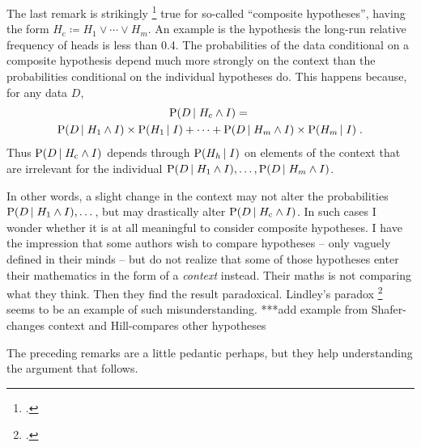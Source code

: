\documentclass[\ifafour a4paper,12pt,\else a5paper,10pt,\fi%
onecolumn,oneside,article,%
british%
]{memoir}
\theoremstyle{remark}
\theoremstyle{innote}
\newcommand*{\citep}{\footcites}
\newcommand*{\defd}{\coloneqq}
\newcommand*{\p}{\mathrm{P}}%
\renewcommand*{\|}[1][]{\nonscript\,#1\vert\nonscript\;\mathopen{}}
\newcommand*{\sect}{\S}%
\newcommand*{\cf}{{cf.}}
\newcommand*{\prop}[1]{\text{\textquoteleft}#1\text{\textquoteright}}
\newcommand*{\yK}{I}
\newcommand*{\yHc}{H_{\text{c}}}
\begin{document}
The last remark is strikingly \citep[\cf][\sect~6.1.4
p.~391]{bernardoetal1994_r2000} true for so-called \enquote{composite
  hypotheses}, having the form $\yHc \defd H_{1} \lor \dotsb \lor H_{m}$.
An example is the hypothesis \prop{the long-run relative frequency of heads
  is less than 0.4}. The probabilities of the data conditional on a
composite hypothesis depend much more strongly on the context than the
probabilities conditional on the individual hypotheses do. This happens
because, for any data $D$,
\begin{multline}
  \label{eq:comp_hyp}
  \p( D \| %
  \yHc \land \yK)
  ={}\\
 \p( D \| H_{1} \land \yK) \times \p(H_{1} \| \yK) +
  \dotsb +
 \p( D \| H_{m} \land \yK) \times \p(H_{m} \| \yK) \;.
\end{multline}
Thus $\p( D \| \yHc \land \yK)$ depends through $\p(H_{h} \| \yK)$ on
elements of the context that are irrelevant for the individual
$\p( D \| H_{1} \land \yK),\dotsc, \p( D \| H_{m} \land \yK)$.

In other words, a slight change in the context may not alter the
probabilities $\p( D \| H_{1} \land \yK),\dotsc$, but may drastically alter
$\p( D \| \yHc \land \yK)$. In such cases I wonder whether it is at all
meaningful to consider composite hypotheses. I have the impression that
some authors wish to compare hypotheses -- only vaguely defined in their
minds -- but do not realize that some of those hypotheses enter their
mathematics in the form of a \emph{context} instead. Their maths is not
comparing what they think. Then they find the result paradoxical. Lindley's
paradox \citep{lindley1957} seems to be an example of such
misunderstanding. ***add example from Shafer-changes context and
Hill-compares other hypotheses

\medskip

The preceding remarks are a little pedantic perhaps, but they help
understanding the argument that follows.
\end{document}
